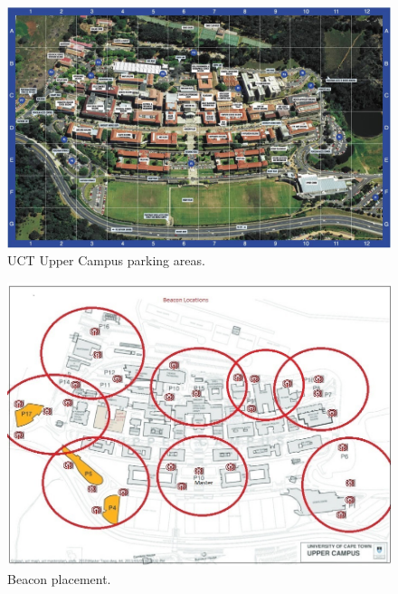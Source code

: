 \newpage
\begin{figure}[H]
\begin{center}
\includegraphics[scale=0.3]{data/mechanical/8.png}
\caption{UCT Upper Campus parking areas.}
\label{fig:mech-8}
\end{center}
\end{figure}

\begin{figure}[H]
\begin{center}
\includegraphics[scale=0.5]{data/mechanical/9.jpg}
\caption{Beacon placement.}
\label{fig:mech-9}
\end{center}
\end{figure}





